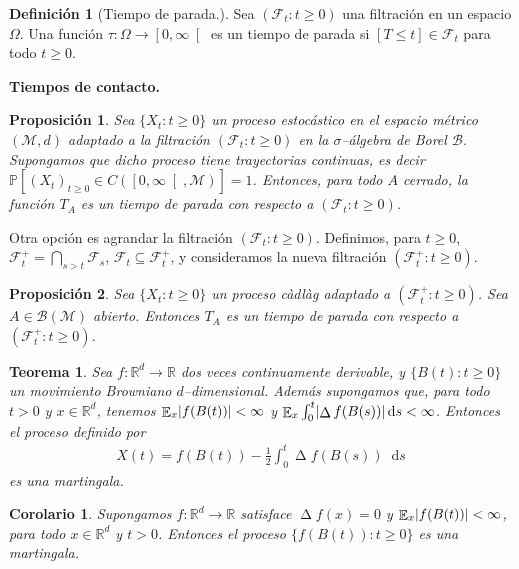 \documentclass{report}
\newcommand{\cadlag}{càdlàg}
\newcommand{\prob}{\mathbb{P}}
\newcommand{\events}{\mathcal{F}}
\newcommand{\eventspp}{\events^+}
\newcommand{\borel}{\mathcal{B}}
\newcommand{\metricSpace}{\mathcal{M}}
\newcommand{\brownian}{B}
\newcommand{\dd}{\mathop{}\!\mathrm{d}}
\newcommand{\realNumbers}{\mathbb{R}}
\DeclareMathOperator{\laplacian}{\Delta}
\DeclareMathOperator{\Expectation}{\mathbb{E}}
\DeclarePairedDelimiter{\abs}{\lvert}{\rvert}
\theoremstyle{plain}
\newtheorem{theorem}{Teorema}
\newtheorem{proposition}{Proposición}
\newtheorem{corollary}{Corolario}
\theoremstyle{remark}
\theoremstyle{definition}
\newtheorem{definition}{Definición}
\begin{document}
\begin{definition}[Tiempo de parada.]
Sea \((\events_t : t \geq 0)\) una filtración en un espacio \(\Omega\).
Una función \(\tau : \Omega \rightarrow \left[ 0, \infty \right[\) es un tiempo de parada si \([T \leq t] \in \events_t\) para todo \(t \geq 0\).
\end{definition}

\textbf{Tiempos de contacto.}

\begin{proposition}
  Sea \(\{X_t : t \geq 0\}\) un proceso estocástico en el espacio métrico \((\metricSpace{}, d)\) adaptado a la filtración \((\events_t : t \geq 0)\) en la \(\sigma\)--álgebra de Borel \(\borel\).
  Supongamos que dicho proceso tiene trayectorias continuas, es decir \(\prob[ (X_t)_{t \geq 0} \in C(\left[0, \infty \right[, \metricSpace{})] = 1\).
  Entonces, para todo \(A\) cerrado, la función \(T_A\) es un tiempo de parada con respecto a \((\events_t : t \geq 0)\).
\end{proposition}

Otra opción es agrandar la filtración \((\events_t : t \geq 0)\).
Definimos, para \(t \geq 0\), \(\eventspp_t = \bigcap_{s > t} \events_s\), \(\events_t \subseteq \eventspp_t\), y consideramos la nueva filtración \((\eventspp_t : t \geq 0)\).
\begin{proposition}
  Sea \(\{X_t : t \geq 0\}\) un proceso \cadlag{} adaptado a \((\eventspp_t : t \geq 0)\).
  Sea \(A \in \borel(\metricSpace{})\) abierto.
  Entonces \(T_A\) es un tiempo de parada con respecto a \((\eventspp_t : t \geq 0)\).
\end{proposition}


\begin{theorem}
  Sea \(f : \realNumbers^d \rightarrow \realNumbers\) dos veces continuamente derivable, y \(\{\brownian(t) : t \geq 0\}\) un movimiento Browniano \(d\)--dimensional.
  Además supongamos que, para todo \(t > 0\) y \(x \in \realNumbers^d\), tenemos \(\Expectation_x \abs{f(\brownian(t))} < \infty\) y \(\Expectation_x \int_0^t \abs{\laplacian f(\brownian(s))} \dd s < \infty\).
  Entonces el proceso definido por
  \begin{align}
    X(t)
    =
    f(\brownian(t)) - \frac{1}{2} \int_0^t \laplacian f(\brownian(s)) \dd s
  \end{align}
  es una martingala.
\end{theorem}
\begin{corollary}
  Supongamos \(f : \realNumbers^d \rightarrow \realNumbers\) satisface \(\laplacian f(x) = 0\) y \(\Expectation_x \abs{f(\brownian(t))} < \infty\), para todo \(x \in \realNumbers^d\) y \(t > 0\).
  Entonces el proceso \(\{f(\brownian(t)) : t \geq 0\}\) es una martingala.
\end{corollary}
\end{document}
